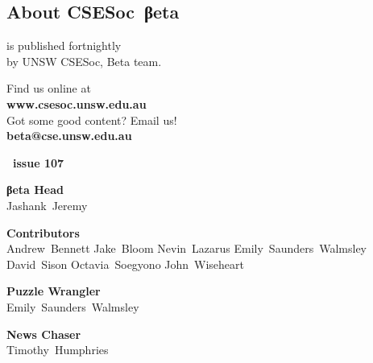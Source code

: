 \documentclass[twoside]{article}
\date{23 May 2015}
\makeatletter
\gdef\the@year{2015}
\gdef\the@issue{107}
\makeatother
\begin{document}

\newpage
\maketitle\thispagestyle{mag}
\begin{multicols}{2}\begingroup
\section*{About CSE{}Soc~βeta}\begin{center}
\csesocbeta{} is published fortnightly\\
by UNSW CSESoc, Beta team.
\par Find us online at\\
\textbf{www.csesoc.unsw.edu.au}\\
Got some good content? Email us!\\
\textbf{beta@cse.unsw.edu.au}\\
\vspace{1em}\par
{\Large\bf\makeatletter \the@year\ issue \the@issue}
\par{\bf\sffamily βeta Head}\\ Jashank~Jeremy
\par{\bf\sffamily Contributors}\\
  Andrew~Bennett\hsp{}
  Jake~Bloom\hsp{}
  Nevin~Lazarus\hsp{}
  Emily~Saunders~Walmsley\hsp{}
  David~Sison\hsp{}
  Octavia~Soegyono\hsp{}
  John~Wiseheart\hsp{}
\par{\bf\sffamily Puzzle Wrangler}\\ Emily~Saunders~Walmsley
\par{\bf\sffamily News Chaser}\\ Timothy~Humphries
\end{center}

\vfill\malcontents\raggedcolumns\columnbreak
\endgroup\raggedcolumns


\end{multicols}
\end{document}

